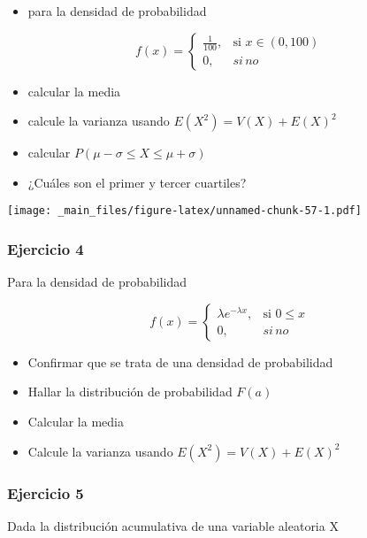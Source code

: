 \documentclass[
]{book}
\providecommand{\tightlist}{%
  \setlength{\itemsep}{0pt}\setlength{\parskip}{0pt}}
\begin{document}
\begin{itemize}
\tightlist
\item
  para la densidad de probabilidad
\end{itemize}

\[
    f(x)= 
\begin{cases}
    \frac{1}{100},& \text{si } x\in (0,100)\\
    0,& si \, no 
\end{cases}
\]

\begin{itemize}
\tightlist
\item
  calcular la media
\item
  calcule la varianza usando \(E(X^2)=V(X)+E(X)^2\)
\item
  calcular \(P(\mu-\sigma\leq X \leq \mu+\sigma)\)
\item
  ¿Cuáles son el primer y tercer cuartiles?
\end{itemize}

\texttt{[image: \_main\_files/figure-latex/unnamed-chunk-57-1.pdf]}

\hypertarget{ejercicio-4-1}{%
\subsubsection{Ejercicio 4}\label{ejercicio-4-1}}

Para la densidad de probabilidad

\[
    f(x)= 
\begin{cases}
    \lambda e^{-\lambda x},& \text{si } 0 \leq x\\
    0,& si \, no 
\end{cases}
\]

\begin{itemize}
\tightlist
\item
  Confirmar que se trata de una densidad de probabilidad
\item
  Hallar la distribución de probabilidad \(F(a)\)
\item
  Calcular la media
\item
  Calcule la varianza usando \(E(X^2)=V(X)+E(X)^2\)
\end{itemize}

\hypertarget{ejercicio-5-1}{%
\subsubsection{Ejercicio 5}\label{ejercicio-5-1}}

Dada la distribución acumulativa de una variable aleatoria X
\end{document}
